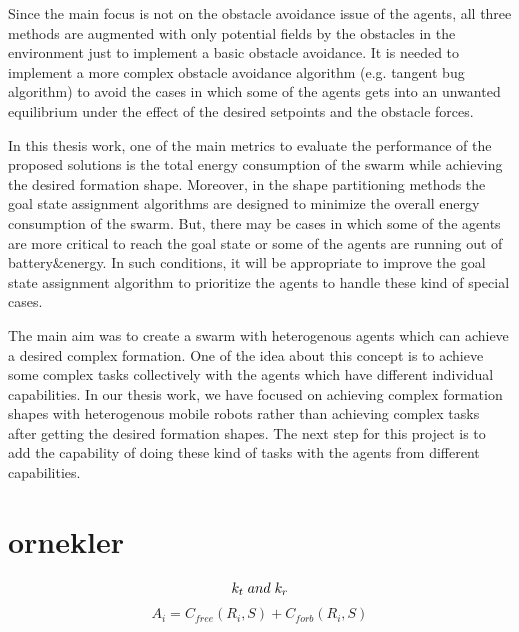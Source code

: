 \documentclass[twoside]{article}
\begin{document}
    Since the main focus is not on the obstacle avoidance issue of the agents, all three methods are augmented with only potential fields by the obstacles in the environment just to implement a basic obstacle avoidance. It is needed to implement a more complex obstacle avoidance algorithm (e.g. tangent bug algorithm) to avoid the cases in which some of the agents gets into an unwanted equilibrium under the effect of the desired setpoints and the obstacle forces.
    
    In this thesis work, one of the main metrics to evaluate the performance of the proposed solutions is the total energy consumption of the swarm while achieving the desired formation shape. Moreover, in the shape partitioning methods the goal state assignment algorithms are designed to minimize the overall energy consumption of the swarm. But, there may be cases in which some of the agents are more critical to reach the goal state or some of the agents are running out of battery$\&$energy. In such conditions, it will be appropriate to improve the goal state assignment algorithm to prioritize the agents to handle these kind of special cases. 
    
    The main aim was to create a swarm with heterogenous agents which can achieve a desired complex formation. One of the idea about this concept is to achieve some complex tasks collectively with the agents which have different individual capabilities. In our thesis work, we have focused on achieving complex formation shapes with heterogenous mobile robots rather than achieving complex tasks after getting the desired formation shapes. The next step for this project is to add the capability of doing these kind of tasks with the agents from different capabilities.
		
		
		
		
		
		
		
		
		
		
		
		
		
		
		
		
		
		\section{ornekler}
		
		\begin{equation}
 k_t  \hspace{0.1cm}and\hspace{0.1cm} k_r
		\end{equation}
			\begin{equation}
			A_i = C_{free}(R_i,S) + C_{forb}(R_i,S)
			\end{equation}	
			
\end{document}
